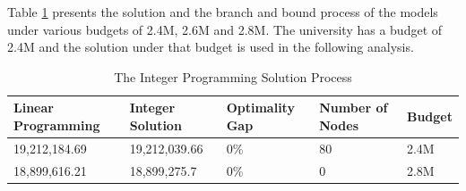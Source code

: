 \documentclass[12pt,english]{report}
\begin{document}
Table \ref{IPSolution}  presents the solution and the branch and bound process
of the models under various budgets of 2.4M, 2.6M and 2.8M.  The university has
a budget of 2.4M and the solution under that budget is used in the following
analysis.
\begin{table}[ht]
\centering
\caption{The Integer Programming Solution Process}
\label{IPSolution}
\begin{tabular}{|l|l|l|l|l|} \hline
Linear Programming & Integer Solution & Optimality Gap & Number of Nodes &
Budget  \\ \hline
19,212,184.69     & 19,212,039.66    &   0\%            &     80        &
2.4M\\ \hline
18,899,616.21   &    18,899,275.7          &    0\%           &     0        &
2.8M \\ \hline
\end{tabular}
\end{table}

\end{document}

